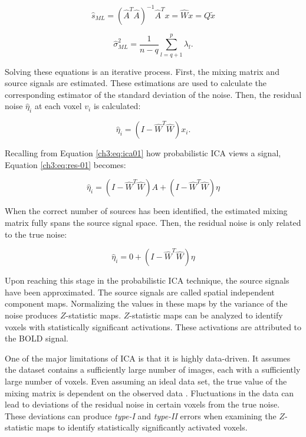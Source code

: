 {\begin{equation}
\hat{s}_{ML} = (\hat{A}^T\hat{A})^{-1}\hat{A}^Tx = \hat{W}x = Q \tilde{x}
\end{equation}

\begin{equation}
\hat{\sigma}_{ML}^2 = \frac{1}{n-q} \sum_{l=q+1}^p \lambda_l .
\end{equation}

Solving these equations is an iterative process. First, the mixing matrix and source signals are estimated. These estimations are used to calculate the corresponding estimator of the standard deviation of the noise. Then, the residual noise $\hat{\eta}_i$ at each voxel $v_i$ is calculated:

\begin{equation}
\label{ch3:eq:res-01}
\hat{\eta}_i = (I - \hat{W}^T\hat{W}) x_i.
\end{equation}

\noindent Recalling from Equation \ref{ch3:eq:ica01} how probabilistic ICA views a signal, Equation \ref{ch3:eq:res-01} becomes: 

\begin{equation}
\hat{\eta}_i = (I - \hat{W}^T\hat{W}) A + (I - \hat{W}^T\hat{W}) \eta
\end{equation}

When the correct number of sources has been identified, the estimated mixing matrix fully spans the source signal space. Then, the residual noise is only related to the true noise:

\begin{equation}
\hat{\eta}_i = 0 + (I - \hat{W}^T\hat{W}) \eta
\end{equation}

Upon reaching this stage in the probabilistic ICA technique, the source signals have been approximated. The source signals are called spatial independent component maps. Normalizing the values in these maps by the variance of the noise produces $Z$-statistic maps. $Z$-statistic maps can be analyzed to identify voxels with statistically significant activations. These activations are attributed to the BOLD signal.

One of the major limitations of ICA is that it is highly data-driven. It assumes the dataset contains a sufficiently large number of images, each with a sufficiently large number of voxels. Even assuming an ideal data set, the true value of the mixing matrix is dependent on the observed data \cite{Beckmann2004}. Fluctuations in the data can lead to deviations of the residual noise in certain voxels from the true noise. These deviations can produce \textit{type-I} and \textit{type-II} errors when examining the $Z$-statistic maps to identify statistically significantly activated voxels.
 
}
